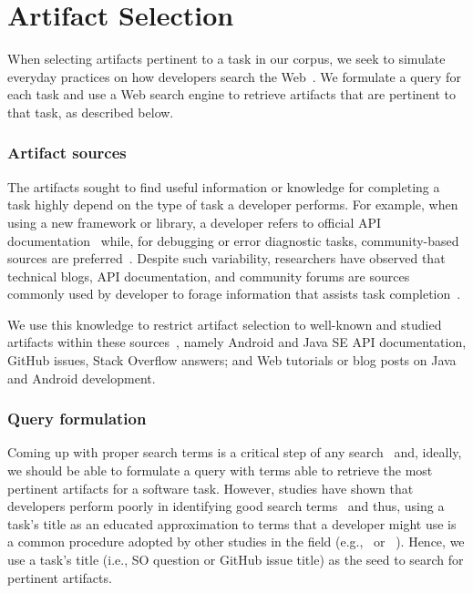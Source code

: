 
\section{Artifact Selection}
\label{cp4:corpus-artifacts}


When selecting artifacts pertinent to a task in our corpus, we seek to simulate everyday practices on how developers search the Web~\cite{rao2020, Xia2017}.
We formulate a query for each task and use a Web search engine to retrieve artifacts that are pertinent to that task, as described below.


\subsubsection{Artifact sources}



The artifacts sought to find useful information or knowledge for completing a task
highly depend on the type of task a developer performs.
For example, when using a new framework or library, a developer refers to official API documentation~\cite{Li2013,robillard2011field} while, for debugging or error diagnostic tasks, community-based sources are preferred~\cite{Li2013,Breu2010}.
Despite such variability, researchers have observed that 
technical blogs, API documentation, and community forums are sources
commonly used by developer to forage information that assists task completion~\cite{Li2013, josyula2018}.



We use this knowledge to restrict artifact selection to well-known and studied artifacts within these sources~\cite{Starke2009,Kevic2014, Li2013}, namely
Android and Java SE API documentation, GitHub issues, Stack Overflow answers; and Web tutorials or blog posts on Java and Android development.





\subsubsection{Query formulation}




Coming up with proper search terms is a critical step of any search~\cite{Haiduc2013}
and, ideally, we should be able to formulate a query with terms able to retrieve the most pertinent artifacts for a software task.
However, studies have shown that developers perform poorly in identifying good search terms~\cite{Starke2009,Kevic2014} and thus, using a task's title
as an educated approximation to terms that a developer might use is a common procedure adopted by other studies in the field (e.g.,~\cite{Xu2017} or ~\cite{Silva2019}).
Hence, we use a task's title (i.e., SO question or GitHub issue title) as the seed to search for pertinent artifacts.



